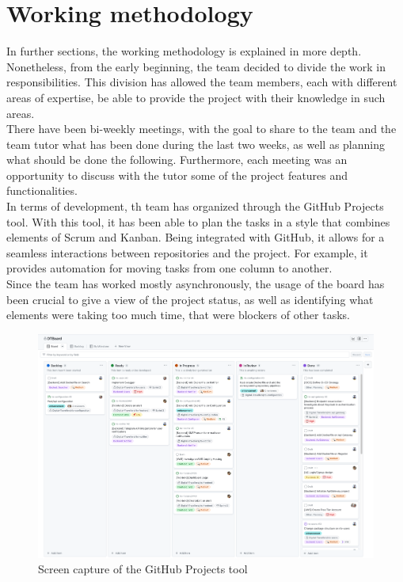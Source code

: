 \documentclass[../memory.tex]{subfiles}
\begin{document}
\section{Working methodology}
In further sections, the working methodology is explained in more depth.
Nonetheless, from the early beginning, the team decided to divide the work in
responsibilities. This division has allowed the team members, each with
different areas of expertise, be able to provide the project with their
knowledge in such areas.
\\
There have been bi-weekly meetings, with the goal to share to the team and the
team tutor what has been done during the last two weeks, as well as planning
what should be done the following. Furthermore, each meeting was an opportunity
to discuss with the tutor some of the project features and functionalities.
\\[8pt]
In terms of development, th team has organized through the GitHub Projects tool.
With this tool, it has been able to plan the tasks in a style that combines
elements of Scrum and Kanban. Being integrated with GitHub, it allows for a
seamless interactions between repositories and the project. For example, it
provides automation for moving tasks from one column to another.
\\
Since the team has worked mostly asynchronously, the usage of the board has been
crucial to give a view of the project status, as well as identifying what
elements were taking too much time, that were blockers of other tasks.
\begin{figure}[H]
	\centering
	\includegraphics[width=\textwidth]{./assets/github-projects.png}
	\caption{Screen capture of the GitHub Projects tool}
\end{figure}
\end{document}
